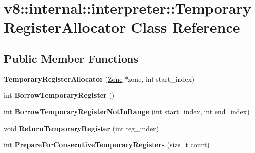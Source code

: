 \hypertarget{classv8_1_1internal_1_1interpreter_1_1_temporary_register_allocator}{}\section{v8\+:\+:internal\+:\+:interpreter\+:\+:Temporary\+Register\+Allocator Class Reference}
\label{classv8_1_1internal_1_1interpreter_1_1_temporary_register_allocator}
\subsection*{Public Member Functions}
\begin{DoxyCompactItemize}
\item 
{\bfseries Temporary\+Register\+Allocator} (\hyperlink{classv8_1_1internal_1_1_zone}{Zone} $\ast$zone, int start\+\_\+index)\hypertarget{classv8_1_1internal_1_1interpreter_1_1_temporary_register_allocator_ad46b3668fe967b573b2c0db4433a7830}{}\label{classv8_1_1internal_1_1interpreter_1_1_temporary_register_allocator_ad46b3668fe967b573b2c0db4433a7830}

\item 
int {\bfseries Borrow\+Temporary\+Register} ()\hypertarget{classv8_1_1internal_1_1interpreter_1_1_temporary_register_allocator_a46caa936bb7b20cbd3df60534f93a5d5}{}\label{classv8_1_1internal_1_1interpreter_1_1_temporary_register_allocator_a46caa936bb7b20cbd3df60534f93a5d5}

\item 
int {\bfseries Borrow\+Temporary\+Register\+Not\+In\+Range} (int start\+\_\+index, int end\+\_\+index)\hypertarget{classv8_1_1internal_1_1interpreter_1_1_temporary_register_allocator_a88b4a272cdc76f6ec5a70fcc987ad2a0}{}\label{classv8_1_1internal_1_1interpreter_1_1_temporary_register_allocator_a88b4a272cdc76f6ec5a70fcc987ad2a0}

\item 
void {\bfseries Return\+Temporary\+Register} (int reg\+\_\+index)\hypertarget{classv8_1_1internal_1_1interpreter_1_1_temporary_register_allocator_a2b74328749d0e776fbf56255ecd9dff5}{}\label{classv8_1_1internal_1_1interpreter_1_1_temporary_register_allocator_a2b74328749d0e776fbf56255ecd9dff5}

\item 
int {\bfseries Prepare\+For\+Consecutive\+Temporary\+Registers} (size\+\_\+t count)\hypertarget{classv8_1_1internal_1_1interpreter_1_1_temporary_register_allocator_ab8a92973a1003ba6b66026dd6210ef51}{}\label{classv8_1_1internal_1_1interpreter_1_1_temporary_register_allocator_ab8a92973a1003ba6b66026dd6210ef51}


\end{DoxyCompactItemize}
